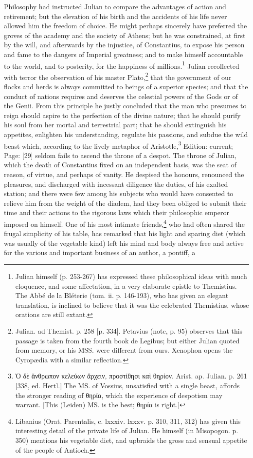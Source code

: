 Philosophy had instructed Julian to compare the advantages of action and retirement; but the elevation of his birth and the accidents of his life never allowed him the freedom of choice. He might perhaps sincerely have preferred the groves of the academy and the society of Athens; but he was constrained, at first by the will, and afterwards by the injustice, of Constantius, to expose his person and fame to the dangers of Imperial greatness; and to make himself accountable to the world, and to posterity, for the happiness of millions.\footnote{Julian himself (p. 253-267) has expressed these philosophical ideas with much eloquence, and some affectation, in a very elaborate epistle to Themistius. The Abbé de la Bléterie (tom. ii. p. 146-193), who has given an elegant translation, is inclined to believe that it was the celebrated Themistius, whose orations are still extant.} Julian recollected with terror the observation of his master Plato,\footnote{Julian. ad Themist. p. 258 [p. 334]. Petavius (note, p. 95) observes that this passage is taken from the fourth book de Legibus; but either Julian quoted from memory, or his MSS. were different from ours. Xenophon opens the Cyropædia with a similar reflection.} that the government of our flocks and herds is always committed to beings of a superior species; and that the conduct of nations requires and deserves the celestial powers of the Gods or of the Genii. From this principle he justly concluded that the man who presumes to reign should aspire to the perfection of the divine nature; that he should purify his soul from her mortal and terrestrial part; that he should extinguish his appetites, enlighten his understanding, regulate his passions, and subdue the wild beast which, according to the lively metaphor of Aristotle,\footnote{\textgreek{\texthebrew{Ὁ} δ\texthebrew{ὲ ἄ}νθρωπον κελεύων \texthebrew{ἄ}ρχειν, προστίθησι κα\texthebrew{ὶ} θηρίον}. Arist. ap. Julian. p. 261 [338, ed. Hertl.] The MS. of Vossius, unsatisfied with a single beast, affords the stronger reading of \textgreek{θηρία}, which the experience of despotism may warrant. [This (Leiden) MS. is the best; \textgreek{θηρία} is right.]} Edition: current; Page: [29] seldom fails to ascend the throne of a despot. The throne of Julian, which the death of Constantius fixed on an independent basis, was the seat of reason, of virtue, and perhaps of vanity. He despised the honours, renounced the pleasures, and discharged with incessant diligence the duties, of his exalted station; and there were few among his subjects who would have consented to relieve him from the weight of the diadem, had they been obliged to submit their time and their actions to the rigorous laws which their philosophic emperor imposed on himself. One of his most intimate friends,\footnote{Libanius (Orat. Parentalis, c. lxxxiv. lxxxv. p. 310, 311, 312) has given this interesting detail of the private life of Julian. He himself (in Misopogon. p. 350) mentions his vegetable diet, and upbraids the gross and sensual appetite of the people of Antioch.} who had often shared the frugal simplicity of his table, has remarked that his light and sparing diet (which was usually of the vegetable kind) left his mind and body always free and active for the various and important business of an author, a pontiff, a 